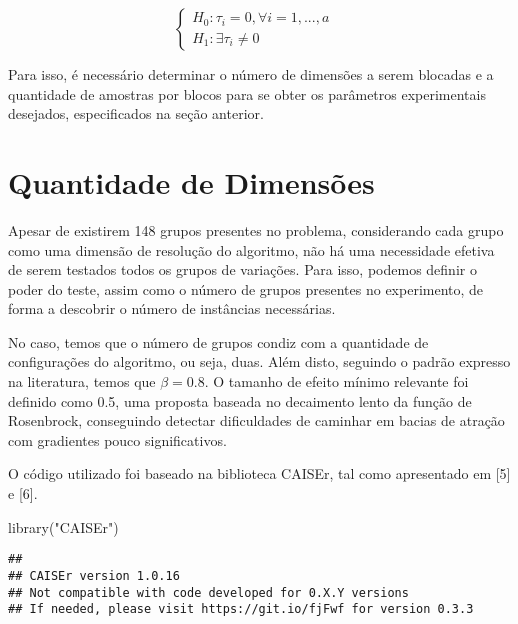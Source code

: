 \documentclass[
]{article}
\newenvironment{Shaded}{\begin{snugshade}}{\end{snugshade}}
\newcommand{\AttributeTok}[1]{\textcolor[rgb]{0.77,0.63,0.00}{#1}}
\newcommand{\DecValTok}[1]{\textcolor[rgb]{0.00,0.00,0.81}{#1}}
\newcommand{\FloatTok}[1]{\textcolor[rgb]{0.00,0.00,0.81}{#1}}
\newcommand{\FunctionTok}[1]{\textcolor[rgb]{0.00,0.00,0.00}{#1}}
\newcommand{\NormalTok}[1]{#1}
\newcommand{\OtherTok}[1]{\textcolor[rgb]{0.56,0.35,0.01}{#1}}
\newcommand{\SpecialCharTok}[1]{\textcolor[rgb]{0.00,0.00,0.00}{#1}}
\newcommand{\StringTok}[1]{\textcolor[rgb]{0.31,0.60,0.02}{#1}}
\begin{document}
\[\begin{cases} H_0: \tau_{i} = 0, \forall i=1,...,a&\\H_1: \exists \tau_{i}\neq0\end{cases}\]

Para isso, é necessário determinar o número de dimensões a serem
blocadas e a quantidade de amostras por blocos para se obter os
parâmetros experimentais desejados, especificados na seção anterior.

\hypertarget{quantidade-de-dimensuxf5es}{%
\section{Quantidade de Dimensões}\label{quantidade-de-dimensuxf5es}}

Apesar de existirem 148 grupos presentes no problema, considerando cada
grupo como uma dimensão de resolução do algoritmo, não há uma
necessidade efetiva de serem testados todos os grupos de variações. Para
isso, podemos definir o poder do teste, assim como o número de grupos
presentes no experimento, de forma a descobrir o número de instâncias
necessárias.

No caso, temos que o número de grupos condiz com a quantidade de
configurações do algoritmo, ou seja, duas. Além disto, seguindo o padrão
expresso na literatura, temos que \(\beta = 0.8\). O tamanho de efeito
mínimo relevante foi definido como 0.5, uma proposta baseada no
decaimento lento da função de Rosenbrock, conseguindo detectar
dificuldades de caminhar em bacias de atração com gradientes pouco
significativos.

O código utilizado foi baseado na biblioteca CAISEr, tal como
apresentado em {[}5{]} e {[}6{]}.

\begin{Shaded}
\begin{Highlighting}[]
\FunctionTok{library}\NormalTok{(}\StringTok{"CAISEr"}\NormalTok{)}
\end{Highlighting}
\end{Shaded}

\begin{verbatim}
## 
## CAISEr version 1.0.16
## Not compatible with code developed for 0.X.Y versions
## If needed, please visit https://git.io/fjFwf for version 0.3.3
\end{verbatim}

\begin{Shaded}
\end{Shaded}
\end{document}
